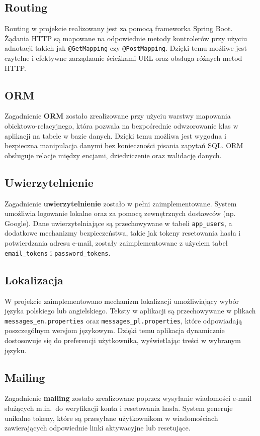 \documentclass[12pt]{article}
\begin{document}
	\subsection{Routing}
	Routing w projekcie realizowany jest za pomocą frameworka Spring Boot. Żądania HTTP są mapowane na odpowiednie metody kontrolerów przy użyciu adnotacji takich jak \texttt{@GetMapping} czy \texttt{@PostMapping}. Dzięki temu możliwe jest czytelne i efektywne zarządzanie ścieżkami URL oraz obsługa różnych metod HTTP.
	
	\subsection{ORM}
	Zagadnienie \textbf{ORM} zostało zrealizowane przy użyciu warstwy mapowania obiektowo-relacyjnego, która pozwala na bezpośrednie odwzorowanie klas w aplikacji na tabele w bazie danych. Dzięki temu możliwa jest wygodna i bezpieczna manipulacja danymi bez konieczności pisania zapytań SQL. ORM obsługuje relacje między encjami, dziedziczenie oraz walidację danych.
	
	\subsection{Uwierzytelnienie}
	Zagadnienie \textbf{uwierzytelnienie} zostało w pełni zaimplementowane. System umożliwia logowanie lokalne oraz za pomocą zewnętrznych dostawców (np. Google). Dane uwierzytelniające są przechowywane w tabeli \texttt{app\_users}, a dodatkowe mechanizmy bezpieczeństwa, takie jak tokeny resetowania hasła i potwierdzania adresu e-mail, zostały zaimplementowane z użyciem tabel \texttt{email\_tokens} i \texttt{password\_tokens}.
	
	\subsection{Lokalizacja}
	W projekcie zaimplementowano mechanizm lokalizacji umożliwiający wybór języka polskiego lub angielskiego. Teksty w aplikacji są przechowywane w plikach \texttt{messages\_en.properties} oraz \texttt{messages\_pl.properties}, które odpowiadają poszczególnym wersjom językowym. Dzięki temu aplikacja dynamicznie dostosowuje się do preferencji użytkownika, wyświetlając treści w wybranym języku.
	
	\subsection{Mailing}
	Zagadnienie \textbf{mailing} zostało zrealizowane poprzez wysyłanie wiadomości e-mail służących m.in.~do weryfikacji konta i resetowania hasła. System generuje unikalne tokeny, które są przesyłane użytkownikom w wiadomościach zawierających odpowiednie linki aktywacyjne lub resetujące.
	
\end{document}
